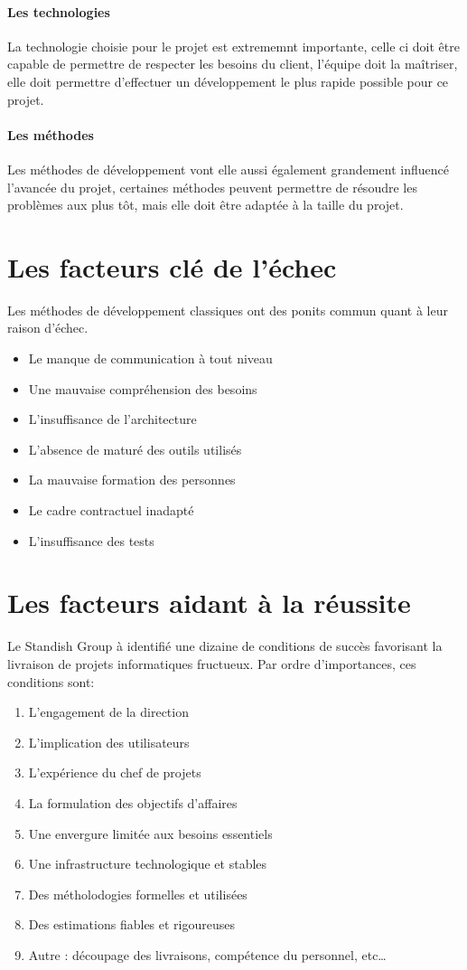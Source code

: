 	\paragraph{Les technologies}
	La technologie choisie pour le projet est extrememnt importante, celle ci doit être capable de permettre de respecter les besoins du client, l'équipe doit la maîtriser, elle doit permettre d'effectuer un développement 
	le plus rapide possible pour ce projet.
	\paragraph{Les méthodes} Les méthodes de développement vont elle aussi également grandement influencé l'avancée du projet, certaines méthodes peuvent permettre de résoudre les problèmes aux plus tôt, mais elle doit
	être adaptée à la taille du projet.
	\newpage
	\section*{Les facteurs clé de l'échec}
	Les méthodes de développement classiques ont des ponits commun quant à leur raison d'échec. 
	\begin{itemize}
		\item Le manque de communication à tout niveau
		\item Une mauvaise compréhension des besoins
		\item L'insuffisance de l'architecture
		\item L'absence de maturé des outils utilisés
		\item La mauvaise formation des personnes
		\item Le cadre contractuel inadapté
		\item L'insuffisance des tests
	\end{itemize}
	\section*{Les facteurs aidant à la réussite}
	Le Standish Group à identifié une dizaine de conditions de succès favorisant la livraison de projets informatiques fructueux.
	Par ordre d'importances, ces conditions sont:
	\begin{enumerate}
		\item L'engagement de la direction
		\item L'implication des utilisateurs
		\item L'expérience du chef de projets
		\item La formulation des objectifs d'affaires
		\item Une envergure limitée aux besoins essentiels
		\item Une infrastructure technologique et stables
		\item Des métholodogies formelles et utilisées
		\item Des estimations fiables et rigoureuses
		\item Autre : découpage des livraisons, compétence du personnel, etc\ldots
	\end{enumerate}
